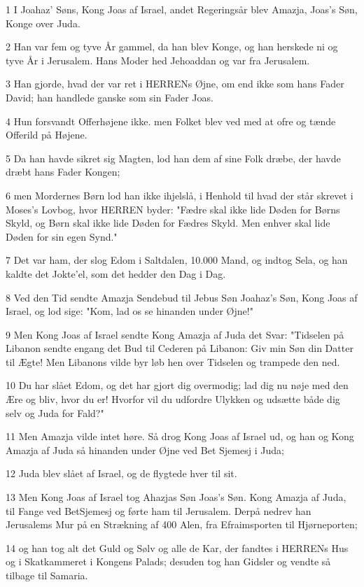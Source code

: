 \par 1 I Joahaz' Søns, Kong Joas af Israel, andet Regeringsår blev Amazja, Joas's Søn, Konge over Juda.
\par 2 Han var fem og tyve År gammel, da han blev Konge, og han herskede ni og tyve År i Jerusalem. Hans Moder hed Jehoaddan og var fra Jerusalem.
\par 3 Han gjorde, hvad der var ret i HERRENs Øjne, om end ikke som hans Fader David; han handlede ganske som sin Fader Joas.
\par 4 Hun forsvandt Offerhøjene ikke. men Folket blev ved med at ofre og tænde Offerild på Højene.
\par 5 Da han havde sikret sig Magten, lod han dem af sine Folk dræbe, der havde dræbt hans Fader Kongen;
\par 6 men Mordernes Børn lod han ikke ihjelslå, i Henhold til hvad der står skrevet i Moses's Lovbog, hvor HERREN byder: "Fædre skal ikke lide Døden for Børns Skyld, og Børn skal ikke lide Døden for Fædres Skyld. Men enhver skal lide Døden for sin egen Synd."
\par 7 Det var ham, der slog Edom i Saltdalen, 10.000 Mand, og indtog Sela, og han kaldte det Jokte'el, som det hedder den Dag i Dag.
\par 8 Ved den Tid sendte Amazja Sendebud til Jebus Søn Joahaz's Søn, Kong Joas af Israel, og lod sige: "Kom, lad os se hinanden under Øjne!"
\par 9 Men Kong Joas af Israel sendte Kong Amazja af Juda det Svar: "Tidselen på Libanon sendte engang det Bud til Cederen på Libanon: Giv min Søn din Datter til Ægte! Men Libanons vilde byr løb hen over Tidselen og trampede den ned.
\par 10 Du har slået Edom, og det har gjort dig overmodig; lad dig nu nøje med den Ære og bliv, hvor du er! Hvorfor vil du udfordre Ulykken og udsætte både dig selv og Juda for Fald?"
\par 11 Men Amazja vilde intet høre. Så drog Kong Joas af Israel ud, og han og Kong Amazja af Juda så hinanden under Øjne ved Bet Sjemesj i Juda;
\par 12 Juda blev slået af Israel, og de flygtede hver til sit.
\par 13 Men Kong Joas af Israel tog Ahazjas Søn Joas's Søn. Kong Amazja af Juda, til Fange ved BetSjemesj og førte ham til Jerusalem. Derpå nedrev han Jerusalems Mur på en Strækning af 400 Alen, fra Efraimsporten til Hjørneporten;
\par 14 og han tog alt det Guld og Sølv og alle de Kar, der fandtes i HERRENs Hus og i Skatkammeret i Kongens Palads; desuden tog han Gidsler og vendte så tilbage til Samaria.
